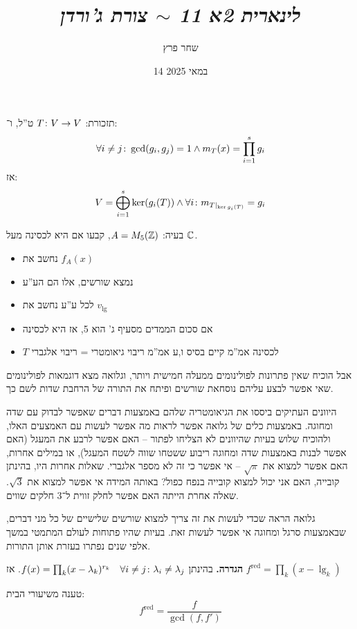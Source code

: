 \documentclass[]{../../../../tex/classes/styledArticle}
\author{שחר פרץ}
\title{\textit{לינארית 2א 11 $\sim$ צורת ג'ורדן}}
\date{14 במאי 2025}
\begin{document}
    \maketitle
    תזכורת: $T \colon V \to V$ ט''ל, ו־: 
    \[ \forall i \neq j \colon \gcd(g_i, g_j) =1 \land m_T(x) = \prod_{i = 1}^{s}g_i \]
    אז: 
    \[ V = \bigoplus_{i = 1}^{s} \ker(g_i(T)) \land \forall i \colon m_{T|_{\ker g_i(T)}} = g_i \]
    
    בעיה: $A = M_5(\mathbb{Z})$, קבעו אם היא לכסינה מעל $\mathbb{C}$. 
    \begin{itemize}
        \item נחשב את $f_A(x)$
        \item נמצא שורשים, אלו הם הע''ע
        \item לכל ע''ע נחשב את $v_\lg$
        \item אם סכום הממדים מסעיף ג' הוא 5, אז היא לכסינה
        \item $T$ לכסינה אמ''מ קיים בסיס ו,ע אמ''מ ריבוי גיאומטרי = ריבוי אלגברי
    \end{itemize}
    
    אבל הוכיח שאין פתרונות לפולינומים ממעלה חמישית ויותר, וגלואה מצא דוגמאות לפולינומים שאי אפשר לבצע עליהם נוסחאת שורשים ופיתח את התורה של הרחבת שדות לשם כך. 
    
    היוונים העתיקים ביססו את הגיאומטריה שלהם באמצעות דברים שאפשר לבדוק עם שדה ומחוגה. באמצעות כלים של גלואה אפשר לראות מה אפשר לעשות עם האמצעים האלו, ולהוכיח שלוש בעיות שהיוונים לא הצליחו לפתור – האם אפשר לרבע את המעגל (האם אפשר לבנות באמצעות שדה ומחוגה ריבוע ששטחו שווה לשטח המעגל), או במילים אחרות, האם אפשר למצוא את $\sqrt\pi$ – אי אפשר כי זה לא מספר אלגברי. שאלות אחרות היו, בהינתן קובייה, האם אני יכול למצוא קובייה בנפח כפול? באותה המידה אי אפשר למצוא את $\sqrt3$. שאלה אחרת הייתה האם אפשר לחלק זווית ל־3 חלקים שווים. 
    
    גלואה הראה שכדי לעשות את זה צריך למצוא שורשים שלישיים של כל מני דברים, שבאמצעות סרגל ומחוגה אי אפשר לעשות זאת. בעיות שהיו פתוחות לעולם המתמטי במשך אלפי שנים נפתרו בעזרת אותן התורות. 
    
    \textbf{הגדרה. }בהינתן $f(x) = \prod_{k}(x - \lambda_k)^{r_k} \quad \forall i \neq j \colon \lambda_i \neq \lambda_j$. אז $f^{\mathrm{red}} = \prod_{k}(x - \lg_k)$
    
    טענה משיעורי הבית: 
    \[ f^{\mathrm{red}} = \frac{f}{\gcd(f, f')} \]
    
    
    
\end{document}
